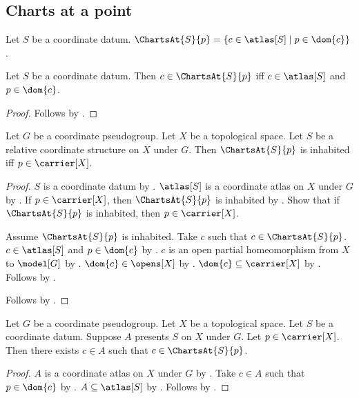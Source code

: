 \subsection{Charts at a point}

\begin{definition}\label{charts_at}
    Let $S$ be a coordinate datum.
    $\ChartsAt{S}{p}=\{c\in\atlas[S]\mid p\in\dom{c}\}$.
\end{definition}

\begin{theorem}\label{charts_at_iff}
    Let $S$ be a coordinate datum.
    Then $c\in\ChartsAt{S}{p}$ iff $c\in\atlas[S]$ and $p\in\dom{c}$.
\end{theorem}
\begin{proof}
    Follows by .
\end{proof}

\begin{theorem}\label{charts_at_inhabited_iff}
    Let $G$ be a coordinate pseudogroup.
    Let $X$ be a topological space.
    Let $S$ be a relative coordinate structure on $X$ under $G$.
    Then $\ChartsAt{S}{p}$ is inhabited iff $p\in\carrier[X]$.
\end{theorem}
\begin{proof}
    $S$ is a coordinate datum by .
    $\atlas[S]$ is a coordinate atlas on $X$ under $G$ by
        .
    If $p\in\carrier[X]$, then $\ChartsAt{S}{p}$ is inhabited by
        .
    Show that if $\ChartsAt{S}{p}$ is inhabited, then $p\in\carrier[X]$.
    \begin{subproof}
        Assume $\ChartsAt{S}{p}$ is inhabited.
        Take $c$ such that $c\in\ChartsAt{S}{p}$.
        $c\in\atlas[S]$ and $p\in\dom{c}$ by .
        $c$ is an open partial homeomorphism from $X$ to $\model[G]$ by
            .
        $\dom{c}\in\opens[X]$ by .
        $\dom{c}\subseteq\carrier[X]$ by .
        Follows by .
    \end{subproof}
    Follows by \auto.
\end{proof}

\begin{theorem}\label{presentation_chart_at_point}
    Let $G$ be a coordinate pseudogroup.
    Let $X$ be a topological space.
    Let $S$ be a coordinate datum.
    Suppose $A$ presents $S$ on $X$ under $G$.
    Let $p\in\carrier[X]$.
    Then there exists $c\in A$ such that $c\in\ChartsAt{S}{p}$.
\end{theorem}
\begin{proof}
    $A$ is a coordinate atlas on $X$ under $G$ by .
    Take $c\in A$ such that $p\in\dom{c}$ by .
    $A\subseteq\atlas[S]$ by .
    Follows by .
\end{proof}

